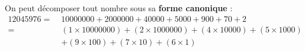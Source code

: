 \begin{defi*}{}{}
On peut décomposer tout nombre sous sa \textbf{forme canonique} :
\begin{align*}
\num{12045976} = \; &\num{10000000} + \num{2000000} + \num{40000} + \num{5000} + 900 + 70 + 2 \\
= \; &(1\times\num{10000000}) + (2\times\num{1000000}) + (4\times\num{10000}) + (5\times\num{1000}) \\
\; &+ (9\times100) +(7\times10) + ( 6\times1)
\end{align*}
\end{defi*}